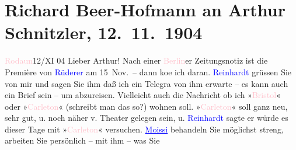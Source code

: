 

               \section[Richard Beer-Hofmann an Arthur Schnitzler, 12. 11. 1904]{ Richard Beer-Hofmann an Arthur Schnitzler, 12. 11. 1904}\nopagebreak{}\rehead{ }\normalsize\beginnumbering{} \toendnotes[C]{\smallbreak\pagebreak[2]} 
\toendnotes[C]{\smallbreak}\pstart
           \raggedleft{}{\pb}\textcolor{pink}{Rodaun}{}\ledrightnote{\textcolor{pink}{Rodaun}}{ }12/XI 04\pend
           \pstart
           Lieber Arthur! Nach einer \textcolor{pink}{Berlin}{}\ledrightnote{\textcolor{pink}{Berlin}}er
               Zeitungsnotiz ist die Première von \textcolor{green}{\textcolor{blue}{Rüderer}{}\ledrightnote{\textcolor{blue}{Josef Ruederer}}}{} am 15 Nov. – dann ko{\geminationm}e ich daran. \textcolor{blue}{Reinhardt}{}\ledrightnote{\textcolor{blue}{Max Reinhardt}} grüssen Sie von mir und sagen Sie ihm
               daß ich ein Telegra{\geminationm} von ihm erwarte – es kann auch ein
               Brief sein – um abzureisen. Vielleicht auch die Nachricht ob ich »\textcolor{pink}{Bristol}{}\ledrightnote{\textcolor{pink}{Hotel Bristol}}« oder »\textcolor{pink}{Carleton}{}\ledrightnote{\textcolor{pink}{Carlton Hotel}}«
               (schreibt man das so?) wohnen soll. »\textcolor{pink}{Carleton}{}\ledrightnote{\textcolor{pink}{Carlton Hotel}}«
               soll ganz neu, sehr gut, u. noch näher v. Theater gelegen sein, u. \textcolor{blue}{Reinhardt}{}\ledrightnote{\textcolor{blue}{Max Reinhardt}} sagte er würde es dieser Tage mit »\textcolor{pink}{Carleton}{}\ledrightnote{\textcolor{pink}{Carlton Hotel}}« versuchen. \textcolor{blue}{\uline{Moissi}}{}\ledrightnote{\textcolor{blue}{Alexander Moissi}} behandeln Sie möglichst streng, arbeiten Sie persönlich – mit ihm – was Sie
